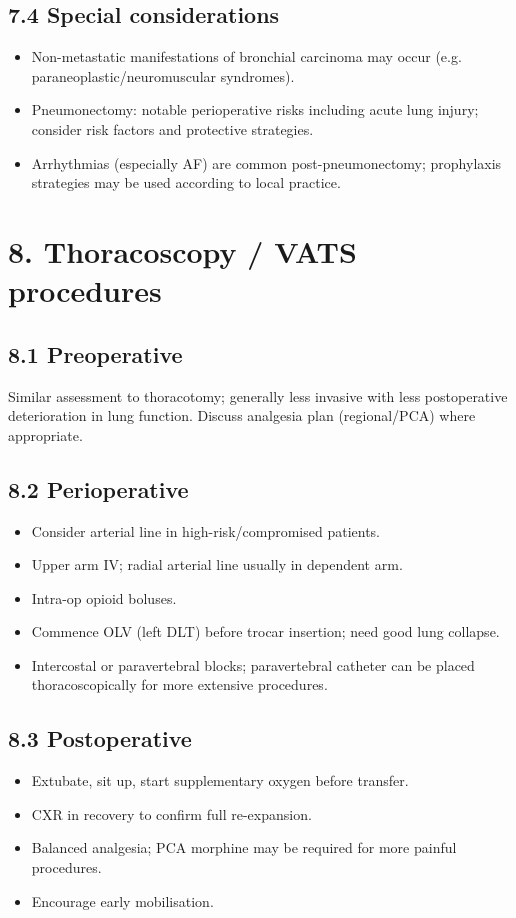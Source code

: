 \documentclass[11pt,a4paper]{article}
\begin{document}
\subsection{7.4 Special considerations}
\begin{itemize}[leftmargin=*, itemsep=2pt]
  \item Non-metastatic manifestations of bronchial carcinoma may occur (e.g. paraneoplastic/neuromuscular syndromes).
  \item Pneumonectomy: notable perioperative risks including acute lung injury; consider risk factors and protective strategies.
  \item Arrhythmias (especially AF) are common post-pneumonectomy; prophylaxis strategies may be used according to local practice.
\end{itemize}

\section{8. Thoracoscopy / VATS procedures}

\subsection{8.1 Preoperative}
Similar assessment to thoracotomy; generally less invasive with less postoperative deterioration in lung function. Discuss analgesia plan (regional/PCA) where appropriate.

\subsection{8.2 Perioperative}
\begin{itemize}[leftmargin=*, itemsep=2pt]
  \item Consider arterial line in high-risk/compromised patients.
  \item Upper arm IV; radial arterial line usually in dependent arm.
  \item Intra-op opioid boluses.
  \item Commence OLV (left DLT) before trocar insertion; need good lung collapse.
  \item Intercostal or paravertebral blocks; paravertebral catheter can be placed thoracoscopically for more extensive procedures.
\end{itemize}

\subsection{8.3 Postoperative}
\begin{itemize}[leftmargin=*, itemsep=2pt]
  \item Extubate, sit up, start supplementary oxygen before transfer.
  \item CXR in recovery to confirm full re-expansion.
  \item Balanced analgesia; PCA morphine may be required for more painful procedures.
  \item Encourage early mobilisation.
\end{itemize}
\end{document}

